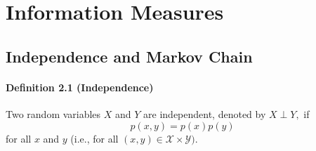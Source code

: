 \documentclass[8pt]{article}
\begin{document}
\section{Information Measures}
\subsection{Independence and Markov Chain}
\begin{tcolorbox}
\paragraph{Definition 2.1 (Independence)} Two random variables $X$ and $Y$ are independent, denoted by $X \perp Y,$ if
$$
p(x, y)=p(x) p(y)
$$
for all $x$ and $y$ (i.e., for all $(x, y) \in \mathcal{X} \times \mathcal{Y})$.
\end{tcolorbox}
\end{document}
